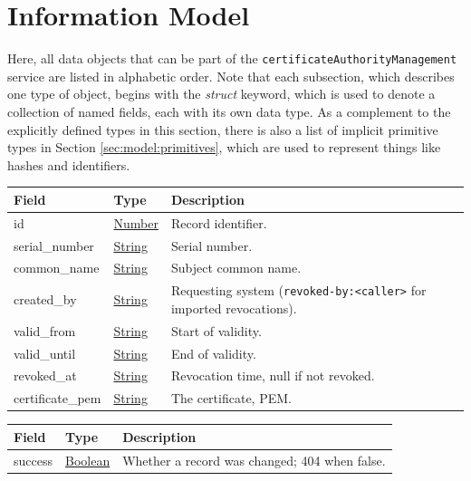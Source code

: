 \documentclass[a4paper]{arrowhead}
\newcommand{\pref}[1]{{\textcolor{ArrowheadGrey}{\hyperref[sec:model:primitives:#1]{#1}}}}
\begin{document}
\newpage

\section{Information Model}
\label{sec:model}

Here, all data objects that can be part of the \texttt{certificate\allowbreak{}Authority\allowbreak{}Management} service are listed in alphabetic order.
Note that each subsection, which describes one type of object, begins with the \textit{struct} keyword, which is used to denote a collection of named fields, each with its own data type.
As a complement to the explicitly defined types in this section, there is also a list of implicit primitive types in Section \ref{sec:model:primitives}, which are used to represent things like hashes and identifiers.





\noindent\begin{tabularx}{\textwidth}{| >{\raggedright\arraybackslash}p{3.9cm} | >{\raggedright\arraybackslash\small}p{5.3cm} | X |} \hline
\rowcolor{gray!33} Field & Type & Description \\ \hline
id & \pref{Number} & Record identifier. \\ \hline
serial\_number & \pref{String} & Serial number. \\ \hline
common\_name & \pref{String} & Subject common name. \\ \hline
created\_by & \pref{String} & Requesting system (\texttt{revoked-\allowbreak{}by:\allowbreak{}\textless{}caller\textgreater{}} for imported revocations). \\ \hline
valid\_from & \pref{String} & Start of validity. \\ \hline
valid\_until & \pref{String} & End of validity. \\ \hline
revoked\_at & \pref{String} & Revocation time, null if not revoked. \\ \hline
certificate\_pem & \pref{String} & The certificate, PEM. \\ \hline
\end{tabularx}







\noindent\begin{tabularx}{\textwidth}{| >{\raggedright\arraybackslash}p{3.9cm} | >{\raggedright\arraybackslash\small}p{5.3cm} | X |} \hline
\rowcolor{gray!33} Field & Type & Description \\ \hline
success & \pref{Boolean} & Whether a record was changed; 404 when false. \\ \hline
\end{tabularx}
\end{document}

